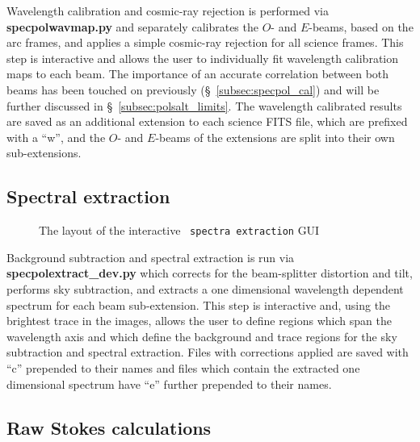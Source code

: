 Wavelength calibration and cosmic-ray rejection is performed via \textbf{specpolwavmap.py} and separately calibrates the $O$- and $E$-beams, based on the arc frames, and applies a simple cosmic-ray rejection for all science frames. This step is interactive and allows the user to individually fit wavelength calibration maps to each beam. The importance of an accurate correlation between both beams has been touched on previously (\S~\ref{subsec:specpol_cal}) and will be further discussed in \S~\ref{subsec:polsalt_limits}. The wavelength calibrated results are saved as an additional extension to each science FITS file, which are prefixed with a ``w'', and the $O$- and $E$-beams of the extensions are split into their own sub-extensions.

\subsection{Spectral extraction}

\begin{figure}[t]
    \centering
    \caption{The layout of the interactive \polsalt\ \texttt{spectra extraction} \gls{GUI}}
    \label{fig:polsalt_gui_spec}
\end{figure}

Background subtraction and spectral extraction is run via \textbf{spec\-pol\-extract\_dev.py} which corrects for the beam-splitter distortion and tilt, performs sky subtraction, and extracts a one dimensional wavelength dependent spectrum for each beam sub-extension. This step is interactive and, using the brightest trace in the images, allows the user to define regions which span the wavelength axis and which define the background and trace regions for the sky subtraction and spectral extraction. Files with corrections applied are saved with ``c'' prepended to their names and files which contain the extracted one dimensional spectrum have ``e'' further prepended to their names.

\subsection{Raw Stokes calculations}

